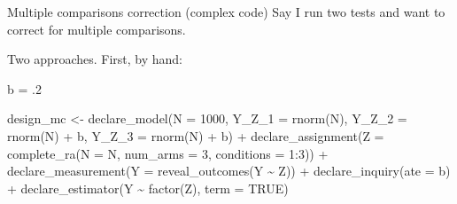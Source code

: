 \documentclass[
  11pt,
  ignorenonframetext,
]{beamer}
\newenvironment{Shaded}{\begin{snugshade}}{\end{snugshade}}
\newcommand{\AttributeTok}[1]{\textcolor[rgb]{0.40,0.45,0.13}{#1}}
\newcommand{\ConstantTok}[1]{\textcolor[rgb]{0.56,0.35,0.01}{#1}}
\newcommand{\DecValTok}[1]{\textcolor[rgb]{0.68,0.00,0.00}{#1}}
\newcommand{\FunctionTok}[1]{\textcolor[rgb]{0.28,0.35,0.67}{#1}}
\newcommand{\NormalTok}[1]{\textcolor[rgb]{0.00,0.23,0.31}{#1}}
\newcommand{\OtherTok}[1]{\textcolor[rgb]{0.00,0.23,0.31}{#1}}
\newcommand{\SpecialCharTok}[1]{\textcolor[rgb]{0.37,0.37,0.37}{#1}}
\begin{document}
\begin{frame}[fragile]{Multiple comparisons correction (complex code)}
\protect\hypertarget{multiple-comparisons-correction-complex-code}{}
Say I run two tests and want to correct for multiple comparisons.

Two approaches. First, by hand:

\begin{Shaded}
\begin{Highlighting}[]
\NormalTok{b }\OtherTok{=}\NormalTok{ .}\DecValTok{2}

\NormalTok{design\_mc }\OtherTok{\textless{}{-}}
  \FunctionTok{declare\_model}\NormalTok{(}\AttributeTok{N =} \DecValTok{1000}\NormalTok{, }\AttributeTok{Y\_Z\_1 =} \FunctionTok{rnorm}\NormalTok{(N), }\AttributeTok{Y\_Z\_2 =} \FunctionTok{rnorm}\NormalTok{(N) }\SpecialCharTok{+}\NormalTok{ b, }\AttributeTok{Y\_Z\_3 =} \FunctionTok{rnorm}\NormalTok{(N) }\SpecialCharTok{+}\NormalTok{ b) }\SpecialCharTok{+}
  \FunctionTok{declare\_assignment}\NormalTok{(}\AttributeTok{Z =} \FunctionTok{complete\_ra}\NormalTok{(}\AttributeTok{N =}\NormalTok{ N, }\AttributeTok{num\_arms =} \DecValTok{3}\NormalTok{, }\AttributeTok{conditions =} \DecValTok{1}\SpecialCharTok{:}\DecValTok{3}\NormalTok{)) }\SpecialCharTok{+}
  \FunctionTok{declare\_measurement}\NormalTok{(}\AttributeTok{Y =} \FunctionTok{reveal\_outcomes}\NormalTok{(Y }\SpecialCharTok{\textasciitilde{}}\NormalTok{ Z)) }\SpecialCharTok{+}
  \FunctionTok{declare\_inquiry}\NormalTok{(}\AttributeTok{ate =}\NormalTok{ b) }\SpecialCharTok{+}
  \FunctionTok{declare\_estimator}\NormalTok{(Y }\SpecialCharTok{\textasciitilde{}} \FunctionTok{factor}\NormalTok{(Z), }\AttributeTok{term =} \ConstantTok{TRUE}\NormalTok{)}
\end{Highlighting}
\end{Shaded}
\end{frame}
\end{document}
